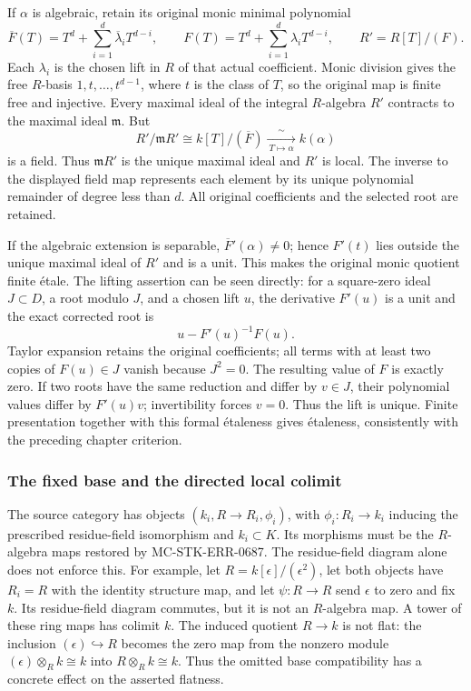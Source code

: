 If \(\alpha\) is algebraic, retain its original monic minimal polynomial \[
 \overline F(T)=T^d+\sum_{i=1}^{d}\overline\lambda_iT^{d-i},
 \qquad
 F(T)=T^d+\sum_{i=1}^{d}\lambda_iT^{d-i},
 \qquad R'=R[T]/(F).
\] Each \(\lambda_i\) is the chosen lift in \(R\) of that actual coefficient. Monic division gives the free \(R\)-basis \(1,t,\ldots,t^{d-1}\), where \(t\) is the class of \(T\), so the original map is finite free and injective. Every maximal ideal of the integral \(R\)-algebra \(R'\) contracts to the maximal ideal \(\mathfrak m\). But \[
 R'/\mathfrak mR'\cong k[T]/(\overline F)
       \xrightarrow[\ T\mapsto\alpha\ ]{\ \sim\ } k(\alpha)
\] is a field. Thus \(\mathfrak mR'\) is the unique maximal ideal and \(R'\) is local. The inverse to the displayed field map represents each element by its unique polynomial remainder of degree less than \(d\). All original coefficients and the selected root are retained.

If the algebraic extension is separable, \(\overline F'(\alpha)\ne0\); hence \(F'(t)\) lies outside the unique maximal ideal of \(R'\) and is a unit. This makes the original monic quotient finite étale. The lifting assertion can be seen directly: for a square-zero ideal \(J\subset D\), a root modulo \(J\), and a chosen lift \(u\), the derivative \(F'(u)\) is a unit and the exact corrected root is \[
 u-F'(u)^{-1}F(u).
\] Taylor expansion retains the original coefficients; all terms with at least two copies of \(F(u)\in J\) vanish because \(J^2=0\). The resulting value of \(F\) is exactly zero. If two roots have the same reduction and differ by \(v\in J\), their polynomial values differ by \(F'(u)v\); invertibility forces \(v=0\). Thus the lift is unique. Finite presentation together with this formal étaleness gives étaleness, consistently with the preceding chapter criterion.

\subsubsection{The fixed base and the directed local colimit}\label{algebra-proof-064-the-fixed-base-and-the-directed-local-colimit}

The source category has objects \((k_i,R\to R_i,\phi_i)\), with \(\phi_i:R_i\to k_i\) inducing the prescribed residue-field isomorphism and \(k_i\subset K\). Its morphisms must be the \(R\)-algebra maps restored by MC-\AlgebraIdentifierBreak{}STK-\AlgebraIdentifierBreak{}ERR-\AlgebraIdentifierBreak{}0687. The residue-field diagram alone does not enforce this. For example, let \(R=k[\epsilon]/(\epsilon^2)\), let both objects have \(R_i=R\) with the identity structure map, and let \(\psi:R\to R\) send \(\epsilon\) to zero and fix \(k\). Its residue-field diagram commutes, but it is not an \(R\)-algebra map. A tower of these ring maps has colimit \(k\). The induced quotient \(R\to k\) is not flat: the inclusion \((\epsilon)\hookrightarrow R\) becomes the zero map from the nonzero module \((\epsilon)\otimes_R k\cong k\) into \(R\otimes_R k\cong k\). Thus the omitted base compatibility has a concrete effect on the asserted flatness.

